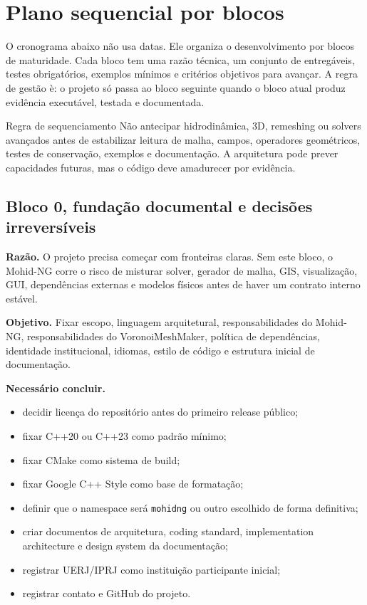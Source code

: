 \documentclass[11pt,a4paper]{article}
\begin{document}
\section{Plano sequencial por blocos}

O cronograma abaixo n\~ao usa datas. Ele organiza o desenvolvimento por blocos de maturidade. Cada bloco tem uma raz\~ao t\'ecnica, um conjunto de entreg\'aveis, testes obrigat\'orios, exemplos m\'inimos e crit\'erios objetivos para avan\c{c}ar. A regra de gest\~ao \`e: o projeto s\'o passa ao bloco seguinte quando o bloco atual produz evid\^encia execut\'avel, testada e documentada.

\begin{warningbox}{Regra de sequenciamento}
N\~ao antecipar hidrodin\^amica, 3D, remeshing ou solvers avan\c{c}ados antes de estabilizar leitura de malha, campos, operadores geom\'etricos, testes de conserva\c{c}\~ao, exemplos e documenta\c{c}\~ao. A arquitetura pode prever capacidades futuras, mas o c\'odigo deve amadurecer por evid\^encia.
\end{warningbox}

\subsection*{Bloco 0, funda\c{c}\~ao documental e decis\~oes irrevers\'iveis}

\textbf{Raz\~ao.} O projeto precisa come\c{c}ar com fronteiras claras. Sem este bloco, o Mohid-NG corre o risco de misturar solver, gerador de malha, GIS, visualiza\c{c}\~ao, GUI, depend\^encias externas e modelos f\'isicos antes de haver um contrato interno est\'avel.

\textbf{Objetivo.} Fixar escopo, linguagem arquitetural, responsabilidades do Mohid-NG, responsabilidades do VoronoiMeshMaker, pol\'itica de depend\^encias, identidade institucional, idiomas, estilo de c\'odigo e estrutura inicial de documenta\c{c}\~ao.

\textbf{Necess\'ario concluir.}
\begin{itemize}
  \item decidir licen\c{c}a do reposit\'orio antes do primeiro release p\'ublico;
  \item fixar C++20 ou C++23 como padr\~ao m\'inimo;
  \item fixar CMake como sistema de build;
  \item fixar Google C++ Style como base de formata\c{c}\~ao;
  \item definir que o namespace ser\'a \texttt{mohidng} ou outro escolhido de forma definitiva;
  \item criar documentos de arquitetura, coding standard, implementation architecture e design system da documenta\c{c}\~ao;
  \item registrar UERJ/IPRJ como institui\c{c}\~ao participante inicial;
  \item registrar contato e GitHub do projeto.
\end{itemize}
\end{document}

